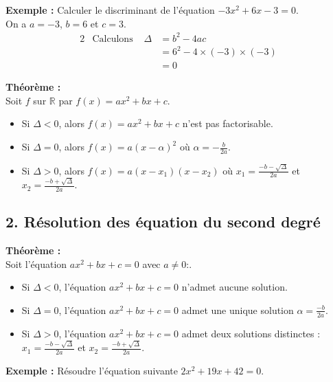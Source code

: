 \documentclass[11pt,a4paper]{article}
\begin{document}
\textbf{Exemple :} Calculer le discriminant de l'équation $-3x^2+6x-3=0$. \\

On a $a=-3$, $b=6$ et $c=3$.
\begin{alignat*}{2}
	 & \text{Calculons } & \Delta & = b^2-4ac                     \\
	 &                   &        & = 6^2 - 4\times(-3)\times(-3) \\
	 &                   &        & = 0
\end{alignat*}

\begin{mdframed}[style=proprieteStyle]
	\textbf{Théorème :} ~\\
	Soit $f$ sur $\mathbb{R}$ par $f(x)=ax^2+bx+c$.
	\begin{itemize}
		\item Si $\Delta<0$, alors $f(x)=ax^2+bx+c$ n'est pas factorisable.
		\item Si $\Delta=0$, alors $f(x)=a(x-\alpha)^2$ où $\alpha=-\frac{b}{2a}$.
		\item Si $\Delta>0$, alors $f(x)=a(x-x_1)(x-x_2)$ où $x_1=\frac{-b-\sqrt{\Delta}}{2a}$ et $x_2=\frac{-b+\sqrt{\Delta}}{2a}$.
	\end{itemize}
\end{mdframed}

\subsection*{2. Résolution des équation du second degré}

\begin{mdframed}[style=proprieteStyle]
	\textbf{Théorème :} ~\\
	Soit l'équation $ax^2+bx+c=0$ avec $a\not=0$:.
	\begin{itemize}
		\item Si $\Delta<0$, l'équation $ax^2+bx+c=0$ n'admet aucune solution.
		\item Si $\Delta=0$, l'équation $ax^2+bx+c=0$ admet une unique solution $\alpha=\frac{-b}{2a}$.
		\item Si $\Delta>0$, l'équation $ax^2+bx+c=0$ admet deux solutions distinctes : $x_1=\frac{-b-\sqrt{\Delta}}{2a}$ et $x_2=\frac{-b+\sqrt{\Delta}}{2a}$.
	\end{itemize}
\end{mdframed}

\textbf{Exemple :} Résoudre l'équation suivante $2x^2+19x+42=0$. \\
\end{document}
